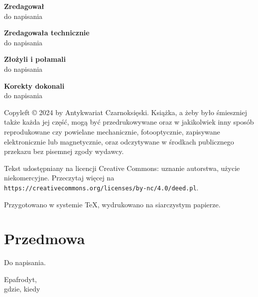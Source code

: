 {\noindent \textbf{Zredagował}\\do napisania} \vspace{5mm}

{\noindent \textbf{Zredagowała technicznie}\\do napisania} \vspace{5mm}

{\noindent \textbf{Złożyli i połamali}\\do napisania} \vspace{5mm}

{\noindent \textbf{Korekty dokonali}\\do napisania} \vfill

{\noindent Copyleft © 2024 by Antykwariat Czarnoksięski.
Książka, a żeby było śmieszniej także każda jej część, mogą być przedrukowywane oraz w jakikolwiek inny sposób reprodukowane czy powielane mechanicznie, fotooptycznie, zapisywane elektronicznie lub magnetycznie, oraz odczytywane w środkach publicznego przekazu bez pisemnej zgody wydawcy.
}

\vspace{5mm}
{
    \noindent
    Tekst udostępniany na licencji Creative Commons: uznanie autorstwa, użycie niekomercyjne. Przeczytaj więcej na \texttt{https://creativecommons.org/licenses/by-nc/4.0/deed.pl}.
}

\vspace{5mm}

{\noindent Przygotowano w systemie \TeX, wydrukowano na siarczystym papierze.}

\newpage
\section*{Przedmowa}
Do napisania.

\begin{flushright}
Epafrodyt,\\gdzie, kiedy
\end{flushright}

\tableofcontents
\cleardoublepage %